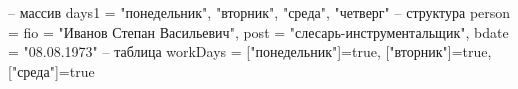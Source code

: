 -- массив
days1 = {"понедельник", "вторник", "среда", "четверг"}
-- структура
person = {fio = "Иванов Степан Васильевич",
          post = "слесарь-инструментальщик",
          bdate = "08.08.1973"}
-- таблица
workDays = {["понедельник"]=true, ["вторник"]=true, ["среда"]=true}

